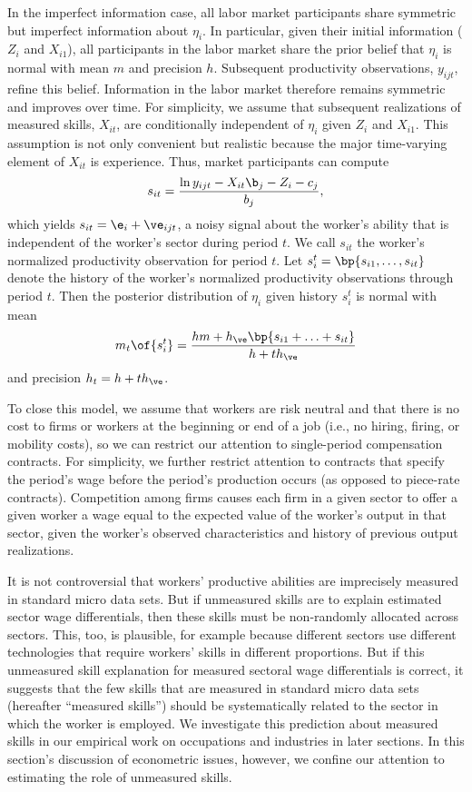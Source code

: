 \documentclass[12pt]{article}
\theoremstyle{definition}
\begin{document}
In the imperfect information case, all labor market participants share symmetric but imperfect information about $\eta_i$. In particular, given their initial information ($Z_i$ and $X_{i1}$), all participants in the labor market share the prior belief that $\eta_i$ is normal with mean $m$ and precision $h$. Subsequent productivity observations, $y_{ijt}$, refine this belief. Information in the labor market therefore remains symmetric and improves over time. For simplicity, we assume that subsequent realizations of measured skills, $X_{it}$, are conditionally independent of $\eta_i$ given $Z_i$ and $X_{i1}$. This assumption is not only convenient but realistic because the major time-varying element of $X_{it}$ is experience. Thus, market participants can compute 
\begin{equation}
    \label{3}
    s_{it} = \frac{\ln y_{ijt} - X_{it} \b_j - Z_i - c_j}{b_j},
\end{equation}
which yields $s_{it} = \e_i + \ve_{ijt}$, a noisy signal about the worker's ability that is independent of the worker's sector during period $t$. We call $s_{it}$ the worker's normalized productivity observation for period $t$. Let $s_i^t = \bp{s_{i1}, \ldots, s_{it}}$ denote the history of the worker's normalized productivity observations through period $t$. Then the posterior distribution of $\eta_i$ given history $s_i^t$ is normal with mean 
\begin{equation}
    m_t\of{s_i^t} = \frac{hm + h_\ve \bp{s_{i1}+ \ldots+ s_{it}}}{h + t h_\ve}
\end{equation}
and precision $h_t = h + t h_{\ve}$.

To close this model, we assume that workers are risk neutral and that there is no cost to firms or workers at the beginning or end of a job (i.e., no hiring, firing, or mobility costs), so we can restrict our attention to single-period compensation contracts. For simplicity, we further restrict attention to contracts that specify the period's wage before the period's production occurs (as opposed to piece-rate contracts). Competition among firms causes each firm in a given sector to offer a given worker a wage equal to the expected value of the worker's output in that sector, given the worker's observed characteristics and history of previous output realizations. 

It is not controversial that workers' productive abilities are imprecisely measured in standard micro data sets. But if unmeasured skills are to explain estimated sector wage differentials, then these skills must be non-randomly allocated across sectors. This, too, is plausible, for example because different sectors use different technologies that require workers' skills in different proportions. But if this unmeasured skill explanation for measured sectoral wage differentials is correct, it suggests that the few skills that are measured in standard micro data sets (hereafter ``measured skills'') should be systematically related to the sector in which the worker is employed. We investigate this prediction about measured skills in our empirical work on occupations and industries in later sections. In this section's discussion of econometric issues, however, we confine our attention to estimating the role of unmeasured skills. 
\end{document}
